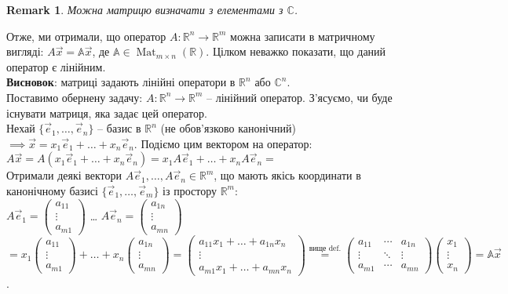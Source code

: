 \documentclass[a4paper, 10pt]{article}
\theoremstyle{theoremdd}
\newtheorem{remark}[theorem]{Remark}
\DeclareMathOperator{\Mat}{Mat}
\begin{document}
	\begin{remark}
	Можна матрицю визначати з елементами з $\mathbb{C}$. 
	\end{remark}
	\noindent
	Отже, ми отримали, що оператор $A \colon \mathbb{R}^n \to \mathbb{R}^m$ можна записати в матричному вигляді: $A\vec{x} = \mathbb{A} \vec{x}$, де $\mathbb{A} \in \Mat_{m \times n}(\mathbb{R})$. Цілком неважко показати, що даний оператор є лінійним. \\
	\textbf{Висновок}: матриці задають лінійні оператори в $\mathbb{R}^n$ або $\mathbb{C}^n$.
	\bigskip \\
	Поставимо обернену задачу: $A \colon \mathbb{R}^n \to \mathbb{R}^m$ -- лінійний оператор. З'ясуємо, чи буде існувати матриця, яка задає цей оператор.\\
	Нехай $\{\vec{e}_1,\dots, \vec{e}_n\}$ -- базис в $\mathbb{R}^n$ (не обов'язково канонічний) $\implies \vec{x} = x_1\vec{e}_1 + \dots + x_n\vec{e}_n$. Подіємо цим вектором на оператор:\\
	$A\vec{x} = A(x_1\vec{e}_1 + \dots + x_n\vec{e}_n) = x_1A\vec{e}_1 + \dots + x_nA\vec{e}_n \boxed{=}$\\
	Отримали деякі вектори $A\vec{e}_1, \dots, A\vec{e}_n \in \mathbb{R}^m$, що мають якісь координати в канонічному базисі $\{ \vec{e}_1,\dots,\vec{e}_m\}$ із простору $\mathbb{R}^m$:\\
	$A\vec{e}_1 = \begin{pmatrix} a_{11} \\ \vdots \\ a_{m1} \end{pmatrix}$ \qquad \dots \qquad
	$A\vec{e}_n = \begin{pmatrix} a_{1n} \\ \vdots \\ a_{mn} \end{pmatrix}$\\
$\boxed{=} x_1 \begin{pmatrix} a_{11} \\ \vdots \\ a_{m1} \end{pmatrix} + \dots +x_n \begin{pmatrix} a_{1n} \\ \vdots \\ a_{mn} \end{pmatrix} = 	
\begin{pmatrix}
	a_{11}x_1 + \dots + a_{1n}x_n \\
	\vdots \\
	a_{m1}x_1 + \dots + a_{mn}x_n
	\end{pmatrix} \overset{\text{вище def.}}{=} \begin{pmatrix}
	a_{11} & \cdots &  a_{1n} \\
	\vdots & \ddots & \vdots \\
	a_{m1} & \cdots & a_{mn}
	\end{pmatrix} \begin{pmatrix}
	x_1 \\ \vdots \\ x_n
	\end{pmatrix} = \mathbb{A}\vec{x}$.\\
\end{document}
